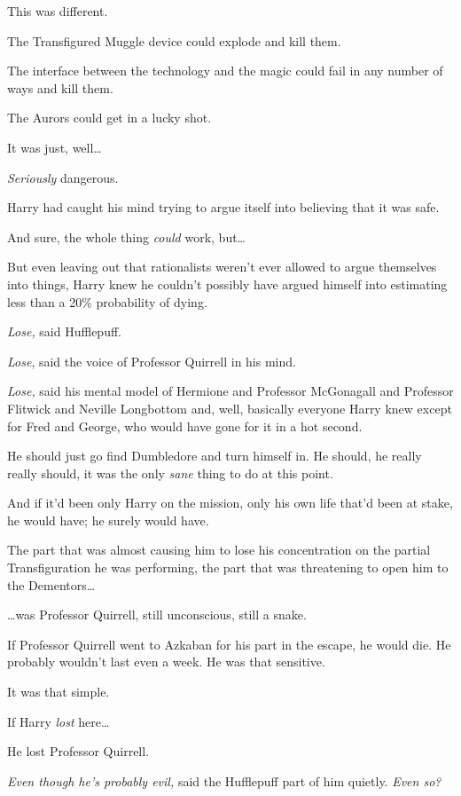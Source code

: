 This was different.

The Transfigured Muggle device could explode and kill them.

The interface between the technology and the magic could fail in any number of
ways and kill them.

The Aurors could get in a lucky shot.

It was just, well{\ldots}

\emph{Seriously} dangerous.

Harry had caught his mind trying to argue itself into believing that it was
safe.

And sure, the whole thing \emph{could} work, but{\ldots}

But even leaving out that rationalists weren't ever allowed to argue themselves
into things, Harry knew he couldn't possibly have argued himself into
estimating less than a 20\% probability of dying.

\emph{Lose,} said Hufflepuff.

\emph{Lose}, said the voice of Professor Quirrell in his mind.

\emph{Lose,} said his mental model of Hermione and Professor McGonagall and
Professor Flitwick and Neville Longbottom and, well, basically everyone Harry
knew except for Fred and George, who would have gone for it in a hot second.

He should just go find Dumbledore and turn himself in. He should, he really
really should, it was the only \emph{sane} thing to do at this point.

And if it'd been only Harry on the mission, only his own life that'd been at
stake, he would have; he surely would have.

The part that was almost causing him to lose his concentration on the partial
Transfiguration he was performing, the part that was threatening to open him to
the Dementors{\ldots}

{\ldots}was Professor Quirrell, still unconscious, still a snake.

If Professor Quirrell went to Azkaban for his part in the escape, he would die.
He probably wouldn't last even a week. He was that sensitive.

It was that simple.

If Harry \emph{lost} here{\ldots}

He lost Professor Quirrell.

\emph{Even though he's probably evil,} said the Hufflepuff part of him quietly.
\emph{Even so?}


